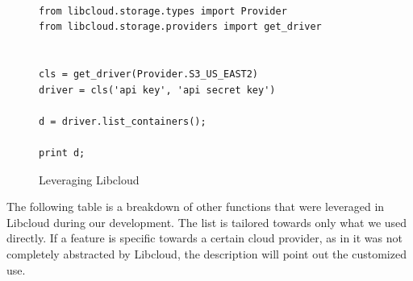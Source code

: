 \begin{figure}[htb]

\begin{verbatim}

from libcloud.storage.types import Provider
from libcloud.storage.providers import get_driver


cls = get_driver(Provider.S3_US_EAST2)
driver = cls('api key', 'api secret key')

d = driver.list_containers();

print d;

\end{verbatim}

\caption{Leveraging Libcloud
~\cite{hid-sp18-518-LibCloud}}\label{c:libcloud-example}

\end{figure}

The following table is a breakdown of other functions that were leveraged in
Libcloud during our development. The list is tailored towards only what we used
directly. If a feature is specific towards a certain cloud provider, as in it
was not completely abstracted by Libcloud, the description will point out the
customized use.

